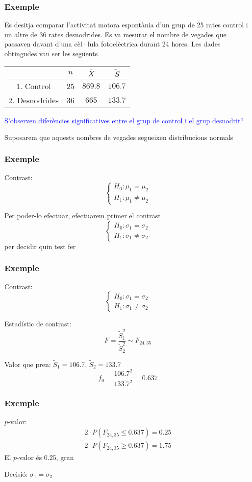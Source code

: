 \documentclass[12pt,t]{beamer}\usepackage[]{graphicx}\usepackage[]{color}
\newcommand{\blue}[1]{\textcolor{blue}{#1}}
\renewcommand{\emph}[1]{{\color{red}#1}}
\renewcommand{\leq}{\leqslant}
\renewcommand{\geq}{\geqslant}
\theoremstyle{plain}
\theoremstyle{definition}
\begin{document}
\begin{frame}
\frametitle{Exemple}
Es desitja comparar l'activitat motora espontània d'un grup de 25 rates control i un altre de 36 rates desnodrides. Es va mesurar el nombre de vegades que passaven davant d'una cèl·lula fotoelèctrica durant 24 hores. Les dades obtingudes van ser les següents

\begin{center}
\begin{tabular}{|c|c|c|c|}
\hline
& $n$ & $\overline{X}$ & $\widetilde{S}$ \\ \hline
1. Control & 25 &  $869.8$ & $106.7$\\ \hline
2. Desnodrides & 36 & $665$ & $133.7$\\ \hline
\end{tabular}
\end{center}

\blue{S'observen diferències significatives entre el grup de control i el grup desnodrit? }\pause\medskip

\emph{Suposarem que aquests nombres de vegades segueixen  distribucions normals}
\end{frame}

\begin{frame}
\frametitle{Exemple}
\emph{Contrast}:
$$
\left\{\begin{array}{l}
H_0:\mu_1=\mu_2\\
H_1:\mu_1\neq \mu_2
\end{array}\right.
$$
\medskip

Per poder-lo efectuar, efectuarem primer el contrast
$$
\left\{\begin{array}{l}
H_0:\sigma_1=\sigma_2\\
H_1:\sigma_1\neq \sigma_2
\end{array}\right.
$$
per decidir quin test fer
\end{frame}

\begin{frame}
\frametitle{Exemple}


\emph{Contrast}:
$$
\left\{\begin{array}{l}
H_0:\sigma_1=\sigma_2\\
H_1:\sigma_1\neq \sigma_2
\end{array}\right.
$$

\emph{Estadístic de contrast}: 
$$
F=\frac{\widetilde{S}_1^2}{\widetilde{S}_2^2}\sim F_{24,35}
$$
\medskip

\emph{Valor que pren}: $\widetilde{S}_1=106.7$, $\widetilde{S}_2=133.7$
$$
f_0=\frac{106.7^2}{133.7^2}=0.637
$$

\end{frame}
\begin{frame}
\frametitle{Exemple}

\emph{$p$-valor}: 
$$
\begin{array}{l}
2\cdot P(F_{24,35}\leq 0.637)= 0.25\\
2\cdot P(F_{24,35}\geq 0.637)=1.75
\end{array}
$$
El $p$-valor és $0.25$, gran
\medskip

\emph{Decisió}:  $\sigma_1= \sigma_2$

\end{frame}
\end{document}
